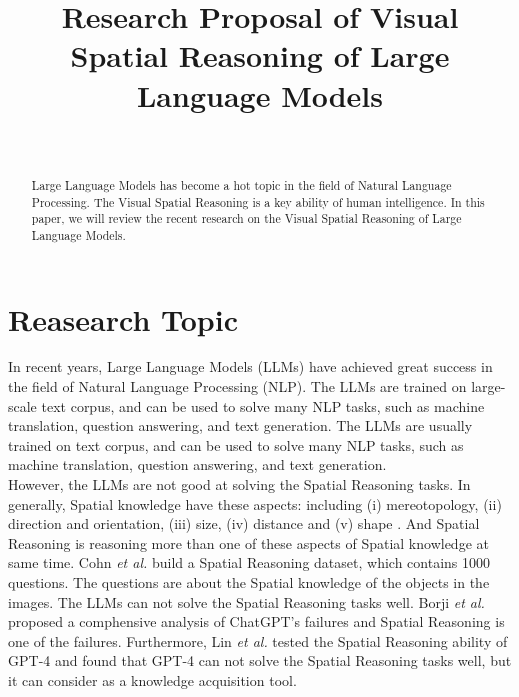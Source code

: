 \documentclass[journal,10pt]{IEEEtran}
\author{
    \IEEEauthorblockN{Jinlong Liu}\\
    \IEEEauthorblockA{Department of Computer Science, University of Liverpool
    \\J.Liu157@liverpool.ac.uk}
}
\title{Research Proposal of Visual Spatial Reasoning of Large Language Models}
\begin{document}
\maketitle
\begin{abstract}
Large Language Models has become a hot topic in the field of Natural Language Processing. The Visual Spatial Reasoning is a key ability of human intelligence. In this paper, we will review the recent research on the Visual Spatial Reasoning of Large Language Models.
\end{abstract}
\section{Reasearch Topic}
In recent years, Large Language Models (LLMs) have achieved great success in the field of Natural Language Processing (NLP). The LLMs are trained on large-scale text corpus, and can be used to solve many NLP tasks, such as machine translation, question answering, and text generation. The LLMs are usually trained on text corpus, and can be used to solve many NLP tasks, such as machine translation, question answering, and text generation.\\
However, the LLMs are not good at solving the Spatial Reasoning tasks. In generally, Spatial knowledge have these aspects: including (i) mereotopology, (ii) direction and orientation, (iii) size, (iv) distance and (v) shape \cite{cohn2008qualitative}. And Spatial Reasoning is  reasoning more than one of these aspects of Spatial knowledge at same time. Cohn \textit{et al.} \cite{cohn2023dialectical} build a Spatial Reasoning dataset, which contains 1000 questions. The questions are about the Spatial knowledge of the objects in the images. The LLMs can not solve the Spatial Reasoning tasks well. Borji \textit{et al.} \cite{borji2023categorical} proposed a comphensive analysis of ChatGPT's failures and Spatial Reasoning is one of the failures. Furthermore, Lin \textit{et al.} \cite{lin2023using} tested the Spatial Reasoning ability of GPT-4 and found that GPT-4 can not solve the Spatial Reasoning tasks well, but it can consider as a knowledge acquisition tool. \\





\end{document}
